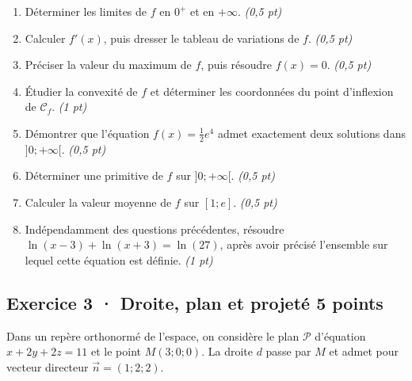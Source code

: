\begin{enumerate}

\item Déterminer les limites de $f$ en $0^+$ et en $+\infty$. \hfill\textit{(0,5 pt)}

\item Calculer $f' (x)$, puis dresser le tableau de variations de $f$. \hfill\textit{(0,5 pt)}

\item Préciser la valeur du maximum de $f$, puis résoudre $f(x)=0$. \hfill\textit{(0,5 pt)}

\item Étudier la convexité de $f$ et déterminer les coordonnées du point d'inflexion de $\mathcal C_f$. \hfill\textit{(1 pt)}

\item Démontrer que l'équation $f(x)=\frac12 e^{4}$ admet exactement deux solutions dans $]0;+\infty[$. \hfill\textit{(0,5 pt)}

\item Déterminer une primitive de $f$ sur $]0;+\infty[$. \hfill\textit{(0,5 pt)}

\item Calculer la valeur moyenne de $f$ sur $[1;e]$. \hfill\textit{(0,5 pt)}

\item Indépendamment des questions précédentes, résoudre $\ln(x-3)+\ln(x+3)=\ln(27)$, après avoir précisé l'ensemble sur lequel cette équation est définie. \hfill\textit{(1 pt)}

\end{enumerate}

\clearpage{}\par

\subsection*{Exercice 3 · Droite, plan et projeté \hfill 5 points}Dans un repère orthonormé de l'espace, on considère le plan $\mathcal P$ d'équation $x+2y+2z=11$ et le point $M(3;0;0)$. La droite $d$ passe par $M$ et admet pour vecteur directeur $\vec n=(1;2;2)$.

